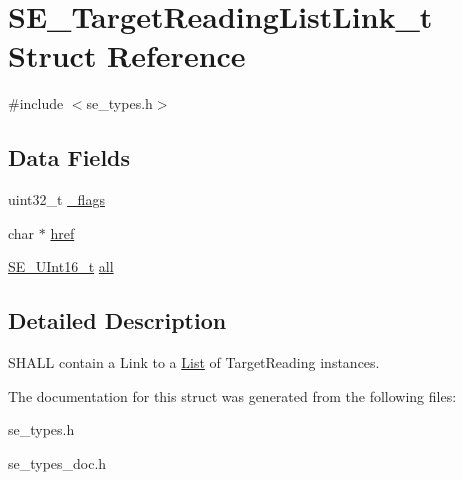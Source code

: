 \hypertarget{structSE__TargetReadingListLink__t}{}\section{S\+E\+\_\+\+Target\+Reading\+List\+Link\+\_\+t Struct Reference}
\label{structSE__TargetReadingListLink__t}


{\ttfamily \#include $<$se\+\_\+types.\+h$>$}

\subsection*{Data Fields}
\begin{DoxyCompactItemize}
\item 
uint32\+\_\+t \hyperlink{group__TargetReadingListLink_gaf9ae193291ad0d9b0f964f277bebb433}{\+\_\+flags}
\item 
char $\ast$ \hyperlink{group__TargetReadingListLink_ga0c31f771ab4c6cc09d0a4326e42810b6}{href}
\item 
\hyperlink{group__UInt16_gac68d541f189538bfd30cfaa712d20d29}{S\+E\+\_\+\+U\+Int16\+\_\+t} \hyperlink{group__TargetReadingListLink_ga9a98530d8abad37e41a80192356f52a3}{all}
\end{DoxyCompactItemize}


\subsection{Detailed Description}
S\+H\+A\+LL contain a Link to a \hyperlink{structList}{List} of Target\+Reading instances. 

The documentation for this struct was generated from the following files\+:\begin{DoxyCompactItemize}
\item 
se\+\_\+types.\+h\item 
se\+\_\+types\+\_\+doc.\+h\end{DoxyCompactItemize}
